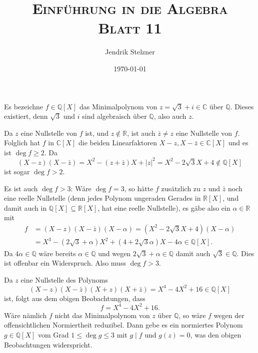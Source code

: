 \documentclass[a4paper,10pt]{article}
\title{\textsc{Einführung in die Algebra \\ \Large Blatt 11}}
\author{Jendrik Stelzner}
\date{\today}
\theoremstyle{definition}
\newcommand{\Q}{\mathbb{Q}}
\newcommand{\R}{\mathbb{R}}
\newcommand{\C}{\mathbb{C}}
\begin{document}
\maketitle





\section{}
Es bezeichne $f \in \Q[X]$ das Minimalpolynom von $z = \sqrt{3}+i \in \C$ über $\Q$. Dieses existiert, denn $\sqrt{3}$ und $i$ sind algebraisch über $\Q$, also auch $z$.

Da $z$ eine Nullstelle von $f$ ist, und $z \not\in \R$, ist auch $\bar{z} \neq z$ eine Nullstelle von $f$. Folglich hat $f$ in $\C[X]$ die beiden Linearfaktoren $X-z, X-\bar{z} \in \C[X]$ und es ist $\deg f \geq 2$. Da
\[
 (X-z)(X-\bar{z}) = X^2 -(z+\bar{z})X + |z|^2 = X^2 -2\sqrt{3}X + 4 \not\in \Q[X]
\]
ist sogar $\deg f > 2$.

Es ist auch $\deg f > 3$: Wäre $\deg f = 3$, so hätte $f$ zusätzlich zu $z$ und $\bar{z}$ noch eine reelle Nullstelle (denn jedes Polynom ungeraden Gerades in $\R[X]$, und damit auch in $\Q[X] \subseteq \R[X]$, hat eine reelle Nullstelle), es gäbe also ein $\alpha \in \R$ mit
\begin{align*}
 f &= (X-z)(X-\bar{z})(X-\alpha) = (X^2 -2\sqrt{3}X + 4)(X-\alpha) \\
   &= X^3 - (2\sqrt{3}+\alpha)X^2 + (4+2\sqrt{3}\alpha)X -4\alpha \in \Q[X].
\end{align*}
Da $4\alpha \in \Q$ wäre bereits $\alpha \in \Q$ und wegen $2\sqrt{3} + \alpha \in \Q$ damit auch $\sqrt{3} \in \Q$. Dies ist offenbar ein Widerspruch. Also muss $\deg f > 3$.

Da $z$ eine Nullstelle des Polynoms
\[
 (X-z)(X-\bar{z})(X+z)(X+\bar{z})
 = X^4 -4X^2 + 16 \in \Q[X]
\]
ist, folgt aus dem obigen Beobachtungen, dass
\[
 f = X^4 -4X^2 + 16.
\]
Wäre nämlich $f$ nicht das Minimalpolynom von $z$ über $\Q$, so wäre $f$ wegen der offensichtlichen Normiertheit reduzibel. Dann gebe es ein normiertes Polynom $g \in \Q[X]$ vom Grad $1 \leq \deg g \leq 3$ mit $g \mid f$ und $g(z) = 0$, was den obigen Beobachtungen widerspricht.





\addtocounter{section}{1}





\section{}
\end{document}
